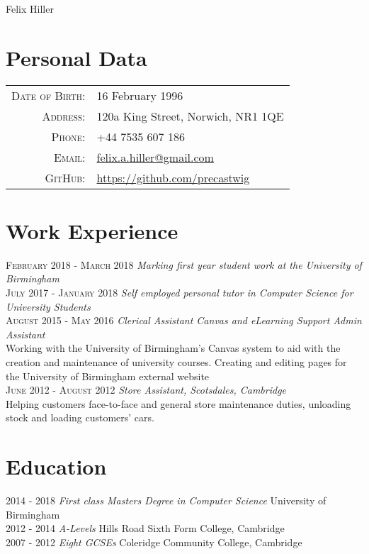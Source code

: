 \documentclass[a4paper, 10pt]{article}
\begin{document}
\pagestyle{empty}

\par{\centering
		{\Huge Felix Hiller
	}\bigskip\par}

\section{Personal Data}

\begin{tabular}{rl}
    \textsc{Date of Birth:} & 16 February 1996\\
    \textsc{Address:}   & 120a King Street, Norwich, NR1 1QE\\
    \textsc{Phone:}     & +44 7535 607 186\\
    \textsc{Email:}     & \href{mailto:felix.a.hiller@gmail.com}{felix.a.hiller@gmail.com}\\
	\textsc{GitHub:}	& \url{https://github.com/precastwig}
\end{tabular}

\section{Work Experience}

 \textsc{February 2018 - March 2018} \emph{Marking first year student work at the University of Birmingham}\\
 \textsc{July 2017 - January 2018} \emph{Self employed personal tutor in Computer Science for University Students}\\
 \textsc{August 2015 - May 2016} \emph{Clerical Assistant Canvas and eLearning Support Admin Assistant}\\
 \footnotesize{Working with the University of Birmingham's Canvas system to aid with the creation and maintenance of university courses. Creating and editing pages for the University of Birmingham external website}\\
 \normalsize\textsc{June 2012 - August 2012} \emph{Store Assistant, Scotsdales, Cambridge}\\
 \footnotesize{Helping customers face-to-face and general store maintenance duties, unloading stock and loading customers' cars.}
\normalsize
\section{Education}
\textsc{2014 - 2018} \emph{First class Masters Degree in Computer Science} University of Birmingham\\
\textsc{2012 - 2014} \emph{A-Levels} Hills Road Sixth Form College, Cambridge \\
\textsc{2007 - 2012} \emph{Eight GCSEs} Coleridge Community College, Cambridge
\end{document}

